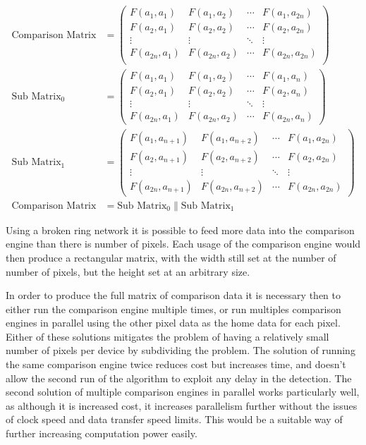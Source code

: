 \begin{align*}
\text{Comparison Matrix} &=  \begin{pmatrix}
  F(a_{1},a_{1}) & F(a_{1},a_{2})  & \cdots & F(a_{1},a_{2n}) \\
  F(a_{2},a_{1}) & F(a_{2},a_{2})  & \cdots & F(a_{2},a_{2n}) \\
  \vdots  & \vdots   & \ddots & \vdots   \\
  F(a_{2n},a_{1}) & F(a_{2n},a_{2}) & \cdots & F(a_{2n},a_{2n}) \\
 \end{pmatrix}  \\
 \text{Sub Matrix}_0 &=
 \begin{pmatrix}
  F(a_{1},a_{1}) & F(a_{1},a_{2})  & \cdots & F(a_{1},a_{n}) \\
  F(a_{2},a_{1}) & F(a_{2},a_{2})  & \cdots & F(a_{2},a_{n}) \\
  \vdots  & \vdots & \ddots & \vdots   \\
  F(a_{2n},a_{1}) & F(a_{2n},a_{2})  & \cdots & F(a_{2n},a_{n})
 \end{pmatrix} \\
\text{Sub Matrix}_1 &=  \begin{pmatrix}
  F(a_{1},a_{n+1}) & F(a_{1},a_{n+2})  & \cdots & F(a_{1},a_{2n}) \\
  F(a_{2},a_{n+1}) & F(a_{2},a_{n+2})  & \cdots & F(a_{2},a_{2n}) \\
  \vdots  & \vdots & \ddots & \vdots   \\
  F(a_{2n},a_{n+1}) & F(a_{2n},a_{n+2})  & \cdots & F(a_{2n},a_{2n})
 \end{pmatrix} \\
 \text{Comparison Matrix} &= \text{Sub Matrix}_0 \parallel \text{Sub Matrix}_1
\end{align*}

\normalsize
Using a broken ring network it is possible to feed more data into the comparison engine than there is number of pixels. Each usage of the comparison engine would then produce a rectangular matrix, with the width still set at the number of number of pixels, but the height set at an arbitrary size. 

In order to produce the full matrix of comparison data it is necessary then to either run the comparison engine multiple times, or run multiples comparison engines in parallel using the other pixel data as the home data for each pixel. Either of these solutions mitigates the problem of having a relatively small number of pixels per device by subdividing the problem. The solution of running the same comparison engine twice reduces cost but increases time, and doesn't allow the second run of the algorithm to exploit any delay in the detection. The second solution of multiple comparison engines in parallel works particularly well, as although it is increased cost, it increases parallelism further without the issues of clock speed and data transfer speed limits. This would be a suitable way of further increasing computation power easily. 


